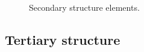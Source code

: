 \begin{figure}[hb]
	\centering
	\\
	\caption{Secondary structure elements.}\label{fig:alpha_beta}
\end{figure}


\subsection{Tertiary structure}


